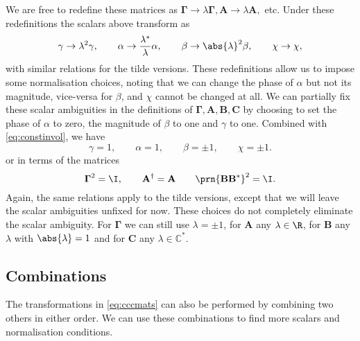 \documentclass[11pt]{article}
\newcommand{\cc}{^\ast}
\newcommand{\hc}{^\dag}
\newcommand{\Gammab}{\boldsymbol{\Gamma}}
\newcommand{\A}{\mathbf{A}}
\newcommand{\B}{\mathbf{B}}
\renewcommand{\C}{\mathbf{C}}
\newcommand{\Cb}{\mathbb{C}}
\begin{document}
We are free to redefine these matrices as \(\Gammab \rightarrow \lambda \Gammab, \A \rightarrow \lambda \A,\) etc.
Under these redefinitions the scalars above transform as
%
\begin{equation*}
  \gamma \rightarrow \lambda^2 \gamma, \qquad
  \alpha \rightarrow \frac{\lambda\cc}{\lambda} \alpha, \qquad
  \beta \rightarrow \abs{\lambda}^2 \beta, \qquad
  \chi \rightarrow \chi,
\end{equation*}
%
with similar relations for the tilde versions.
These redefinitions allow us to impose some normalisation choices, noting that we can change the phase of \(\alpha\) but not its magnitude, vice-versa for \(\beta\), and \(\chi\) cannot be changed at all.
We can partially fix these scalar ambiguities in the definitions of \(\Gammab,\A,\B,\C\) by choosing to set the phase of \(\alpha\) to zero, the magnitude of \(\beta\) to one and \(\gamma\) to one.
Combined with \cref{eq:constinvol}, we have  
%
\begin{equation}\label{eq:normscalar}
  \gamma = 1, \qquad
  \alpha = 1, \qquad
  \beta = \pm 1, \qquad
  \chi = \pm 1.
\end{equation}
%
or in terms of the matrices
%
\begin{equation}\label{eq:normmats}
  \Gammab^2 = \I, \qquad
  \A\hc = \A  \qquad
  \prn{\B \B\cc}^2 = \I.
\end{equation}
%
Again, the same relations apply to the tilde versions, except that we will leave the scalar ambiguities unfixed for now.
These choices do not completely eliminate the scalar ambiguity.
For \(\Gammab\) we can still use \(\lambda = \pm 1\), for \(\A\) any \(\lambda \in \R\), for \(\B\) any \(\lambda\) with \(\abs{\lambda} = 1\) and for \(\C\) any \(\lambda \in \Cb\cc\).


\subsection{Combinations}\label{sec:combo}

The transformations in \cref{eq:cccmats} can also be performed by combining two others in either order.
We can use these combinations to find more scalars and normalisation conditions.
\end{document}
